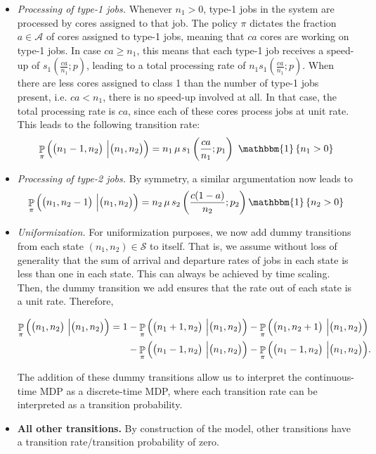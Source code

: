 \documentclass[11pt]{article}
\theoremstyle{remark}
\theoremstyle{definition}
\DeclareMathOperator{\prob}{\mathbb{P}}
\numberwithin{equation}{section}
\begin{document}
{\begin{itemize}
    \item \textit{Processing of type-1 jobs.} Whenever $n_1>0$, type-1 jobs in the system are processed by cores assigned to that job. The policy $\pi$ dictates the fraction $a\in\mathcal{A}$ of cores assigned to type-1 jobs, meaning that $c a$ cores are working on type-1 jobs. In case $c a \ge n_1$, this means that each type-1 job receives a speed-up of $ s_1(\frac{ca}{n_1}; p)$, leading to a total processing rate of $n_1 s_1(\frac{ca}{n_1}; p)$. When there are less cores assigned to class 1 than the number of type-1 jobs present, i.e. $ca < n_1$, there is no speed-up involved at all. In that case, the total processing rate is $ca$, since each of these cores process jobs at unit rate. This leads to the following transition rate:
    \begin{equation}
        \prob_{\pi}\Big(\big(n_1-1,n_2\big) \ \Big\vert \big(n_1, n_2\big) \Big) = n_1\, \mu \, s_1\left(\frac{ca}{n_1};p_1\right) \ \mathbbm{1}\left\{n_1 > 0\right\}\label{eqn:transition_prob:3} 
    \end{equation}

    \item \textit{Processing of type-2 jobs.} By symmetry, a similar argumentation now leads to 
    \begin{equation}
        \prob_{\pi}\Big(\big(n_1,n_2-1\big) \ \Big\vert \big(n_1, n_2\big) \Big) = n_2 \, \mu \, s_2\left(\frac{c(1-a)}{n_2};p_2\right) \mathbbm{1}\left\{n_2 > 0\right\}\label{eqn:transition_prob:4} 
    \end{equation}

\item \textit{Uniformization.} For uniformization purposes, we now add dummy transitions from each state $(n_1, n_2)\in\mathcal{S}$ to itself. That is, we assume without loss of generality that the sum of arrival and departure rates of jobs in each state is less than one in each state.
This can always be achieved by time scaling. Then, the dummy transition we add ensures that the rate out of each state is a unit rate. Therefore,

\begin{align}
\prob_{\pi}\Big(\big(n_1,n_2\big) \ \Big\vert \big(n_1, n_2\big) \Big) = 1&-\prob_{\pi}\Big(\big(n_1 +1,n_2\big) \ \Big\vert \big(n_1, n_2\big) \Big)- \prob_{\pi}\Big(\big(n_1,n_2+1\big) \ \Big\vert \big(n_1, n_2\big) \Big) \notag \\
&-\prob_{\pi}\Big(\big(n_1-1,n_2\big) \ \Big\vert \big(n_1, n_2\big) \Big)-\prob_{\pi}\Big(\big(n_1-1,n_2\big) \ \Big\vert \big(n_1, n_2\big) \Big). \label{eqn:transition_prob:5}
\end{align}

The addition of these dummy transitions allow us to interpret the continuous-time MDP as a discrete-time MDP, where each transition rate can be interpreted as a transition probability.
\item \textbf{All other transitions.} By construction of the model, other transitions have a transition rate/transition probability of zero.
\end{itemize}
}
\end{document}
